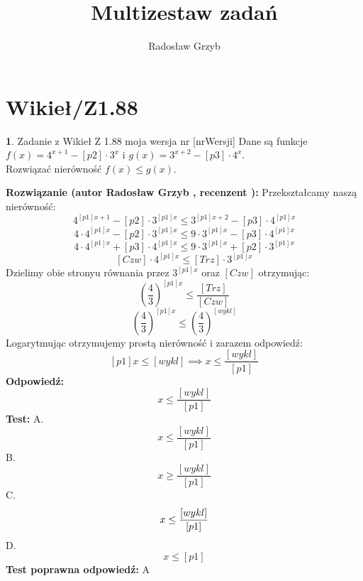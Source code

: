 \documentclass[12pt, a4paper]{article}
\title{Multizestaw zadań}
\author{Radosław Grzyb}
\date{}
\theoremstyle{definition} %
\newtheorem{zad}{}
\newcommand{\kategoria}[1]{\section{#1}} %
\newcommand{\zadStart}[1]{\begin{zad}#1\newline} %
\newcommand{\zadStop}{\end{zad}}   %
\newcommand{\rozwStart}[2]{\noindent \textbf{Rozwiązanie (autor #1 , recenzent #2): }\newline} %
\newcommand{\rozwStop}{\newline}                                            %
\newcommand{\odpStart}{\noindent \textbf{Odpowiedź:}\newline}    %
\newcommand{\odpStop}{\newline}                                             %
\newcommand{\testStart}{\noindent \textbf{Test:}\newline} %
\newcommand{\testStop}{\newline} %
\newcommand{\kluczStart}{\noindent \textbf{Test poprawna odpowiedź:}\newline} %
\newcommand{\kluczStop}{\newline} %
\begin{document}
\maketitle
\kategoria{Wikieł/Z1.88}
\zadStart{Zadanie z Wikieł Z 1.88 moja wersja nr [nrWersji]}
Dane są funkcje $f(x)=4^{x+1}-[p2]\cdot3^{x}$ i $g(x)=3^{x+2}-[p3]\cdot4^{x}$.\\ Rozwiązać nierówność $f(x)\leq g(x)$.
\zadStop
\rozwStart{Radosław Grzyb}{}
Przekształcamy naszą nierówność:
$$4^{[p1]x+1}-[p2]\cdot3^{[p1]x}\leq3^{[p1]x+2}-[p3]\cdot4^{[p1]x}$$
$$4\cdot4^{[p1]x}-[p2]\cdot3^{[p1]x}\leq9\cdot3^{[p1]x}-[p3]\cdot4^{[p1]x}$$
$$4\cdot4^{[p1]x}+[p3]\cdot4^{[p1]x}\leq9\cdot3^{[p1]x}+[p2]\cdot3^{[p1]x}$$
$$[Czw]\cdot4^{[p1]x}\leq[Trz]\cdot3^{[p1]x}$$
Dzielimy obie stronyu równania przez $3^{[p1]x}$ oraz $[Czw]$ otrzymując:
$$\left(\frac{4}{3}\right)^{[p1]x}\leq\frac{[Trz]}{[Czw]}$$
$$\left(\frac{4}{3}\right)^{[p1]x}\leq\left(\frac{4}{3}\right)^{[wykl]}$$
Logarytmując otrzymujemy prostą nierówność i zarazem odpowiedź:
$$[p1]x\leq[wykl]\implies x\leq\frac{[wykl]}{[p1]}$$
\rozwStop
\odpStart
$$x\leq\frac{[wykl]}{[p1]}$$
\odpStop
\testStart
A.$$x\leq\frac{[wykl]}{[p1]}$$
B.$$x\geq\frac{[wykl]}{[p1]}$$
C.$$x\leq\-\frac{[wykl]}{[p1]}$$
D.$$x\leq[p1]$$
\testStop
\kluczStart
A
\kluczStop
\end{document}
